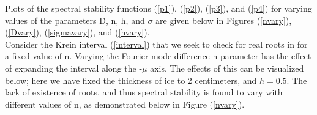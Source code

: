 \documentclass{article}
\begin{document}
Plots of the spectral stability functions (\ref{p1}), (\ref{p2}), (\ref{p3}), and (\ref{p4}) for varying values of the parameters D, n, h, and \(\sigma\) are given below in Figures (\ref{nvary}), (\ref{Dvary}), (\ref{sigmavary}), and (\ref{hvary}). \\

Consider the Krein interval (\ref{interval}) that we seek to check for real roots in for a fixed value of n. Varying the Fourier mode difference n parameter has the effect of expanding the interval along the -\(\mu\) axis. The effects of this can be visualized below; here we have fixed the thickness of ice to 2 centimeters, and \(h = 0.5\). The lack of existence of roots, and thus spectral stability is found to vary with different values of n, as demonstrated below in Figure (\ref{nvary}). \\
\end{document}
